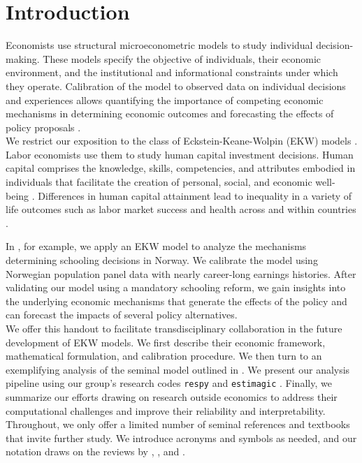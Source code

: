 \section{Introduction}
\noindent Economists use structural microeconometric models to study individual decision-making. These models specify the objective of individuals, their economic environment, and the institutional and informational constraints under which they operate. Calibration of the model to observed data on individual decisions and experiences allows quantifying the importance of competing economic mechanisms in determining economic outcomes and forecasting the effects of policy proposals \citep{Wolpin.2013}.\\

\noindent We restrict our exposition to the class of Eckstein-Keane-Wolpin (EKW) models \citep{Adda.2017, Blundell.2016, Keane.1997}. Labor economists use them to study human capital investment decisions. Human capital comprises the knowledge, skills, competencies, and attributes embodied in individuals that facilitate the creation of personal, social, and economic well-being \citep{Becker.1964}. Differences in human capital attainment lead to inequality in a variety of life outcomes such as labor market success and health across and within countries \citep{OECD.2001}.

In \citet{Bhuller.2018}, for example, we apply an EKW model to analyze the mechanisms determining schooling decisions in Norway. We calibrate the model using Norwegian population panel data with nearly career-long earnings histories. After validating our model using a mandatory schooling reform, we gain insights into the underlying economic mechanisms that generate the effects of the policy and can forecast the impacts of several policy alternatives.\\

\noindent We offer this handout to facilitate transdisciplinary collaboration in the future development of EKW models. We first describe their economic framework, mathematical formulation, and calibration procedure. We then turn to an exemplifying analysis of the seminal model outlined in \citet{Keane.1997}. We present our analysis pipeline using our group's research codes \verb+respy+ \citep{respy-1.0} and \verb+estimagic+ \citep{Gabler.2019}. Finally, we summarize our efforts drawing on research outside economics to address their computational challenges and improve their reliability and interpretability.\\

\noindent Throughout, we only offer a limited number of seminal references and textbooks that invite further study. We introduce acronyms and symbols as needed, and our notation draws on the reviews by \cite{Aguirregabiria.2010}, \cite{Arcidiacono.2011}, and \cite{Puterman.1994}.
